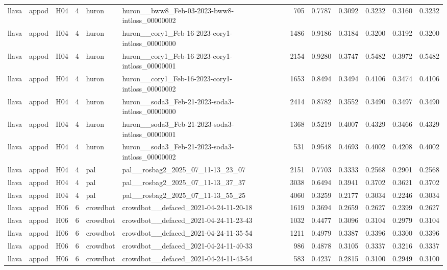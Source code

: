 \begin{table}[tbp]
\begin{tabular}{lllrllrrrrrr}
llava & appod & H04 & 4 & huron & huron\_\_bww8\_Feb-03-2023-bww8-intloss\_00000002 & 705 & 0.7787 & 0.3092 & 0.3232 & 0.3160 & 0.3232 \\
llava & appod & H04 & 4 & huron & huron\_\_cory1\_Feb-16-2023-cory1-intloss\_00000000 & 1486 & 0.9186 & 0.3184 & 0.3200 & 0.3192 & 0.3200 \\
llava & appod & H04 & 4 & huron & huron\_\_cory1\_Feb-16-2023-cory1-intloss\_00000001 & 2154 & 0.9280 & 0.3747 & 0.5482 & 0.3972 & 0.5482 \\
llava & appod & H04 & 4 & huron & huron\_\_cory1\_Feb-16-2023-cory1-intloss\_00000002 & 1653 & 0.8494 & 0.3494 & 0.4106 & 0.3474 & 0.4106 \\
llava & appod & H04 & 4 & huron & huron\_\_soda3\_Feb-21-2023-soda3-intloss\_00000000 & 2414 & 0.8782 & 0.3552 & 0.3490 & 0.3497 & 0.3490 \\
llava & appod & H04 & 4 & huron & huron\_\_soda3\_Feb-21-2023-soda3-intloss\_00000001 & 1368 & 0.5219 & 0.4007 & 0.4329 & 0.3466 & 0.4329 \\
llava & appod & H04 & 4 & huron & huron\_\_soda3\_Feb-21-2023-soda3-intloss\_00000002 & 531 & 0.9548 & 0.4693 & 0.4002 & 0.4208 & 0.4002 \\
llava & appod & H04 & 4 & pal & pal\_\_rosbag2\_2025\_07\_11-13\_23\_07 & 2151 & 0.7703 & 0.3333 & 0.2568 & 0.2901 & 0.2568 \\
llava & appod & H04 & 4 & pal & pal\_\_rosbag2\_2025\_07\_11-13\_37\_37 & 3038 & 0.6494 & 0.3941 & 0.3702 & 0.3621 & 0.3702 \\
llava & appod & H04 & 4 & pal & pal\_\_rosbag2\_2025\_07\_11-13\_55\_25 & 4060 & 0.3259 & 0.2177 & 0.3034 & 0.2246 & 0.3034 \\
llava & appod & H06 & 6 & crowdbot & crowdbot\_\_defaced\_2021-04-24-11-20-18 & 1619 & 0.3694 & 0.2659 & 0.2627 & 0.2399 & 0.2627 \\
llava & appod & H06 & 6 & crowdbot & crowdbot\_\_defaced\_2021-04-24-11-23-43 & 1032 & 0.4477 & 0.3096 & 0.3104 & 0.2979 & 0.3104 \\
llava & appod & H06 & 6 & crowdbot & crowdbot\_\_defaced\_2021-04-24-11-35-54 & 1211 & 0.4979 & 0.3387 & 0.3396 & 0.3300 & 0.3396 \\
llava & appod & H06 & 6 & crowdbot & crowdbot\_\_defaced\_2021-04-24-11-40-33 & 986 & 0.4878 & 0.3105 & 0.3337 & 0.3216 & 0.3337 \\
llava & appod & H06 & 6 & crowdbot & crowdbot\_\_defaced\_2021-04-24-11-43-54 & 583 & 0.4237 & 0.2815 & 0.3100 & 0.2949 & 0.3100 \\

\end{tabular}
\end{table}
